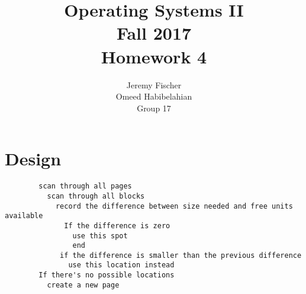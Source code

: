 \documentclass[draftclsnofoot, onecolumn, 10pt, compsoc]{IEEEtran}
\title{\textbf{Operating Systems II}\\Fall 2017\\Homework 4}
\author{Jeremy Fischer\\Omeed Habibelahian\\Group 17}
\begin{document}
	\maketitle
	\newpage
	
	\section{Design}
		\begin{lstlisting}
		scan through all pages
		  scan through all blocks
		    record the difference between size needed and free units available
			  If the difference is zero
			    use this spot
			    end
			 if the difference is smaller than the previous difference
			   use this location instead
		If there's no possible locations
		  create a new page
		\end{lstlisting}
		
	
\end{document}
